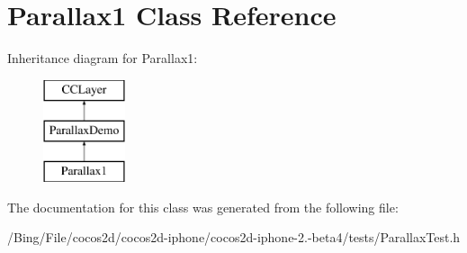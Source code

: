 \hypertarget{interface_parallax1}{\section{Parallax1 Class Reference}
\label{interface_parallax1}
}
Inheritance diagram for Parallax1\-:\begin{figure}[H]
\begin{center}
\leavevmode
\includegraphics[height=3.000000cm]{interface_parallax1}
\end{center}
\end{figure}


The documentation for this class was generated from the following file\-:\begin{DoxyCompactItemize}
\item 
/\-Bing/\-File/cocos2d/cocos2d-\/iphone/cocos2d-\/iphone-\/2.-\/beta4/tests/Parallax\-Test.\-h\end{DoxyCompactItemize}
